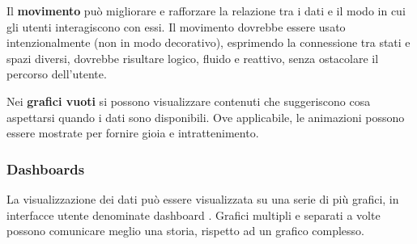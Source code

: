 \documentclass[12pt, a4paper]{report}
\begin{document}
	Il \textbf{movimento} può migliorare e rafforzare la relazione tra i dati e il modo in cui gli utenti interagiscono con essi. Il movimento dovrebbe essere usato intenzionalmente (non in modo decorativo), esprimendo la connessione tra stati e spazi diversi, dovrebbe risultare logico, fluido e reattivo, senza ostacolare il percorso dell'utente.

	Nei \textbf{grafici vuoti} si possono visualizzare contenuti che suggeriscono cosa aspettarsi quando i dati sono disponibili. Ove applicabile, le animazioni possono essere mostrate per fornire gioia e intrattenimento.

	\subsubsection{Dashboards}
	La visualizzazione dei dati può essere visualizzata su una serie di più grafici, in interfacce utente denominate dashboard . Grafici multipli e separati a volte possono comunicare meglio una storia, rispetto ad un grafico complesso.
\end{document}
